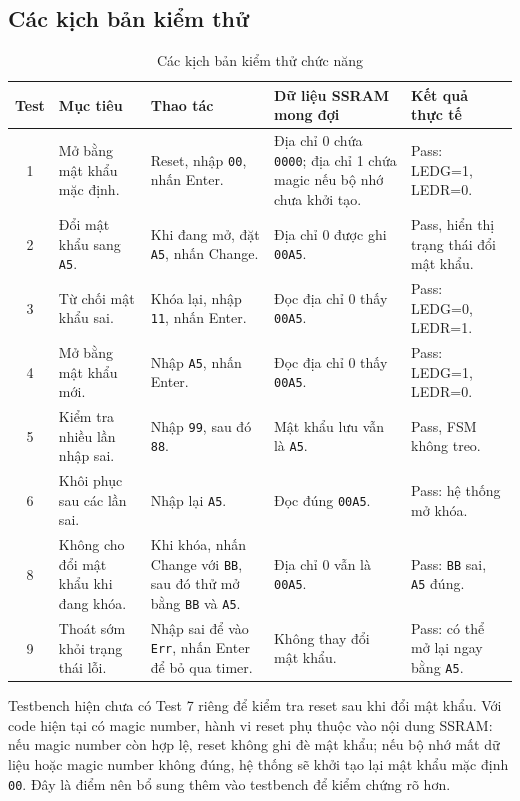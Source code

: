 \documentclass[13pt,a4paper]{article}
\begin{document}
\subsection{Các kịch bản kiểm thử}
\begin{table}[H]
\centering
\caption{Các kịch bản kiểm thử chức năng}
\label{tab:test}
\small
\begin{tabularx}{\textwidth}{|c|X|X|X|X|}
\hline
\textbf{Test} & \textbf{Mục tiêu} & \textbf{Thao tác} & \textbf{Dữ liệu SSRAM mong đợi} & \textbf{Kết quả thực tế}\\
\hline
1 & Mở bằng mật khẩu mặc định. & Reset, nhập \texttt{00}, nhấn Enter. & Địa chỉ 0 chứa \texttt{0000}; địa chỉ 1 chứa magic nếu bộ nhớ chưa khởi tạo. & Pass: LEDG=1, LEDR=0.\\
\hline
2 & Đổi mật khẩu sang \texttt{A5}. & Khi đang mở, đặt \texttt{A5}, nhấn Change. & Địa chỉ 0 được ghi \texttt{00A5}. & Pass, hiển thị trạng thái đổi mật khẩu.\\
\hline
3 & Từ chối mật khẩu sai. & Khóa lại, nhập \texttt{11}, nhấn Enter. & Đọc địa chỉ 0 thấy \texttt{00A5}. & Pass: LEDG=0, LEDR=1.\\
\hline
4 & Mở bằng mật khẩu mới. & Nhập \texttt{A5}, nhấn Enter. & Đọc địa chỉ 0 thấy \texttt{00A5}. & Pass: LEDG=1, LEDR=0.\\
\hline
5 & Kiểm tra nhiều lần nhập sai. & Nhập \texttt{99}, sau đó \texttt{88}. & Mật khẩu lưu vẫn là \texttt{A5}. & Pass, FSM không treo.\\
\hline
6 & Khôi phục sau các lần sai. & Nhập lại \texttt{A5}. & Đọc đúng \texttt{00A5}. & Pass: hệ thống mở khóa.\\
\hline
8 & Không cho đổi mật khẩu khi đang khóa. & Khi khóa, nhấn Change với \texttt{BB}, sau đó thử mở bằng \texttt{BB} và \texttt{A5}. & Địa chỉ 0 vẫn là \texttt{00A5}. & Pass: \texttt{BB} sai, \texttt{A5} đúng.\\
\hline
9 & Thoát sớm khỏi trạng thái lỗi. & Nhập sai để vào \texttt{Err}, nhấn Enter để bỏ qua timer. & Không thay đổi mật khẩu. & Pass: có thể mở lại ngay bằng \texttt{A5}.\\
\hline
\end{tabularx}
\end{table}
\normalsize

Testbench hiện chưa có Test 7 riêng để kiểm tra reset sau khi đổi mật khẩu. Với code hiện tại có magic number, hành vi reset phụ thuộc vào nội dung SSRAM: nếu magic number còn hợp lệ, reset không ghi đè mật khẩu; nếu bộ nhớ mất dữ liệu hoặc magic number không đúng, hệ thống sẽ khởi tạo lại mật khẩu mặc định \texttt{00}. Đây là điểm nên bổ sung thêm vào testbench để kiểm chứng rõ hơn.
\end{document}
